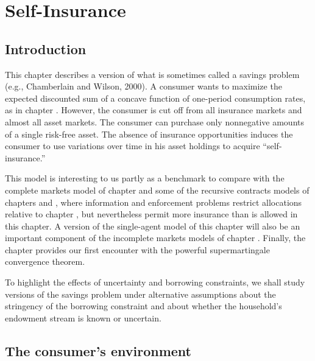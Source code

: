 

%




\def\toone{{t+1}}
\def\ttwo{{t+2}}
\def\tthree{{t+3}}
\def\Tone{{T+1}}
\def\TTT{{T-1}}
\def\rtr{{\rm tr}}
\chapter{Self-Insurance\label{selfinsure}}

\section{Introduction}

  This chapter describes a version of what is sometimes
called a savings problem (e.g., Chamberlain and Wilson, 2000).
A consumer wants to maximize the expected discounted sum of a
concave function of one-period consumption rates, as in
chapter .  However, the consumer is cut off from
all insurance markets and almost all asset markets.  The
consumer can  purchase only nonnegative amounts of a single
risk-free asset.   The absence of insurance opportunities
induces the consumer to use variations over time in his asset holdings to acquire
``self-insurance.''
   

  This model is interesting to us partly as a benchmark to compare
with the complete markets model of  chapter  and some of the
recursive contracts models of chapters  and , where
information and enforcement problems restrict allocations relative to
chapter , but nevertheless permit more insurance than is
allowed in this chapter.  A version of the single-agent model
of this chapter will also be an  important component of the incomplete
markets models  of chapter .  Finally, the chapter
provides our first encounter with the powerful supermartingale convergence theorem.

To highlight the effects of uncertainty and borrowing constraints, we shall
study versions of the savings problem under alternative assumptions about the
stringency of the borrowing constraint and  about
whether the household's endowment stream is known or uncertain.

\section{The consumer's environment}


